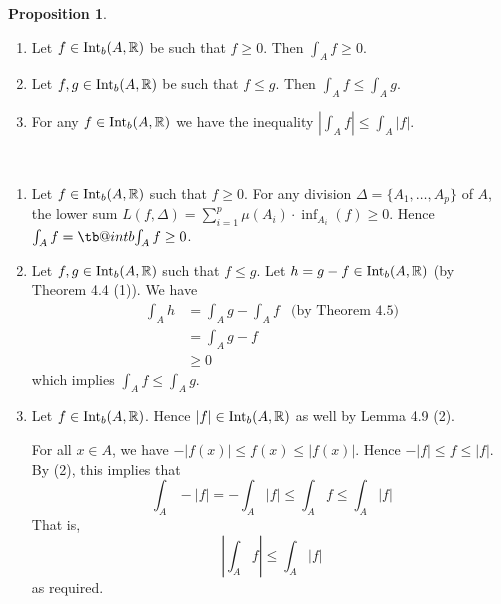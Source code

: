 \documentclass[11pt]{article}
\makeatletter
\theoremstyle{definition}
\newtheorem{prop}[thm]{Proposition}
\newcommand{\R}{\ensuremath{\mathbb{R}}}
\newcommand\bint{\mathop{\mathpalette\tb@int{b}}\!\int}
\newcommand\tb@int[2]{%
  \sbox\z@{$\m@th#1\int$}%
  \if#2t%
    \rlap{\hbox to\wd\z@{%
      \hfil
      \vrule width .35em height \dimexpr\ht\z@+1.4pt\relax depth -\dimexpr\ht\z@+1pt\relax
      \kern.05em %
    }}
  \else
    \rlap{\hbox to\wd\z@{%
      \vrule width .35em height -\dimexpr\dp\z@+1pt\relax depth \dimexpr\dp\z@+1.4pt\relax
      \hfil
    }}
  \fi
}
\newenvironment{pf}[1][\proofname]{\par
  \pushQED{\qed}%
  \normalfont \topsep0\p@\relax
  \trivlist
  \item[\hskip\labelsep\itshape
  #1\@addpunct{.}]\ignorespaces
}{%
  \popQED\endtrivlist\@endpefalse
}
\makeatother
\begin{document}
\begin{prop}~ \vspace{-1.5ex}
\begin{enumerate}[(1)]
\item Let $f \in {\rm Int}_b (A, \R)$ be such that $f \geq 0$. Then $\int_A f \geq 0$.
\item Let $f, g \in {\rm Int}_b (A, \R)$ be such that $f \leq g$. Then $\int_A f \leq \int_A g$.
\item For any $f \in {\rm Int}_b (A, \R)$ we have the inequality $|\int_A f| \leq \int_A |f|$. 
\end{enumerate}
\end{prop}
\begin{pf}~ \vspace{-1.5ex}
\begin{enumerate}[(1)]

    \item Let $f \in {\rm Int}_b (A, \R)$ such that $f \geq 0$. For any division $\Delta = \{A_1, \dots, A_p\}$ of $A$, the lower sum $L(f, \Delta) = \sum_{i=1}^p \mu(A_i) \cdot \inf_{A_i} (f) \geq 0$. Hence $\int_A f = \bint_A f \geq 0$.
    
    \item Let $f, g \in {\rm Int}_b (A, \R)$ such that $f \leq g$. Let $h = g - f \in {\rm Int}_b (A, \R)$ (by Theorem 4.4 (1)). We have
    \begin{align*}
        \int_A h &= \int_A g - \int_A f & \text{(by Theorem 4.5)} \\
        &= \int_A g-f \\
        &\geq 0
    \end{align*}
    which implies $\int_A f \leq \int_A g$.
    
    \item Let $f \in {\rm Int}_b (A, \R)$. Hence $|f| \in {\rm Int}_b (A, \R)$ as well by Lemma 4.9 (2). 
    
    For all $x \in A$, we have $-|f(x)| \leq f(x) \leq |f(x)|$. Hence $-|f| \leq f \leq |f|$. By (2), this implies that 
    $$\int_A -|f| = -\int_A |f| \leq \int_A f \leq \int_A |f|$$
    That is, 
    $$\left|\int_A f\right| \leq \int_A |f|$$ 
    as required. \qedhere
    
\end{enumerate}
\end{pf}
\end{document}
